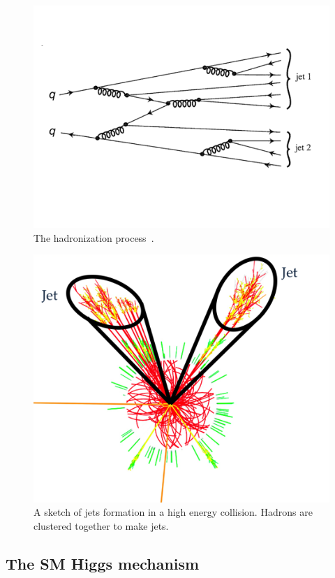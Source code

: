 \begin{figure}[!htbp]
\centering
\includegraphics[width=.7\textwidth]{figures/jets.png}
\caption{The hadronization process~\cite{particlebook1}.}
\label{fig:hadronization}
\end{figure}  

\begin{figure}[!htbp]
\centering
\includegraphics[width=.7\textwidth]{figures/clustering.png}
\caption{A sketch of jets formation in a high energy collision. Hadrons are clustered
together to make jets.}
\label{fig:jet_formation}
\end{figure}  



\subsection{The SM Higgs mechanism}

